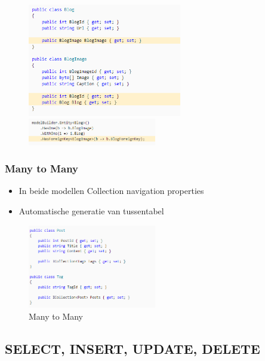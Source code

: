 \documentclass{article}
\begin{document}
\begin{figure}[H]
    \centering
    \includegraphics[width=0.6\textwidth]{efcore-relations-onetoone1.png}
    \includegraphics[width=0.5\textwidth]{efcore-relations-onetoone2.png}
    \caption{}
\end{figure}

\subsubsection{Many to Many}

\begin{itemize}
    \item In beide modellen Collection navigation properties
    \item Automatische generatie van tussentabel
\end{itemize}

\begin{figure}[H]
    \centering
    \includegraphics[width=0.5\textwidth]{efcore-relations-manytomany.png}
    \caption{Many to Many}
\end{figure}

\subsection{SELECT, INSERT, UPDATE, DELETE}
\end{document}
